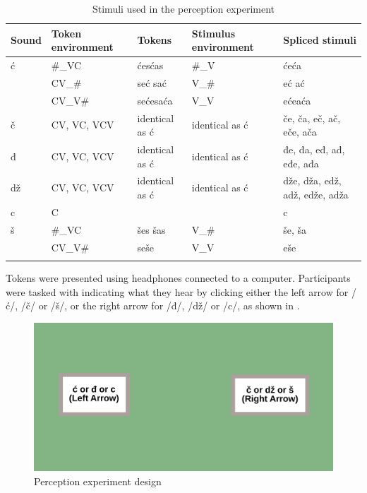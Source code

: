 \documentclass[output=paper,modfonts,nonflat,
]{langsci/langscibook}
\begin{document}
\begin{table}
\begin{tabularx}{\textwidth}{llXQQ}
\lsptoprule
 Sound &  Token environment &  Tokens &  Stimulus environment &  Spliced stimuli\\
\midrule
{ć} & \#\_VC & {ćes}\newline ćas & \#\_V & {će}\newline ća\\
& CV\_\# & {seć} \newline sać & V\_\# & {eć} \newline  ać\\

\tablevspace 
& CV\_V\# & {seće}\newline saća & V\_V & {eće}\newline aća\\

\tablevspace
č & CV, VC, VCV & identical as ć & identical as ć & če, ča, eč, ač, eče, ača\\
{đ} & CV, VC, VCV & identical as ć & identical as ć & đe, đa, eđ, ađ, eđe, ađa\\
dž & CV, VC, VCV & identical as ć & identical as ć & dže, dža, edž, adž, edže, adža\\
c & C &  &  & c\\
{š} & \#\_VC & {šes} \newline šas & V\_\# & še, ša\\
& CV\_V\# & seše & V\_V & eše\\
\lspbottomrule
\end{tabularx}
\caption{\label{tab:mihajlovic:3} Stimuli used in the perception experiment}
\end{table}


Tokens were presented using headphones connected to a computer. Participants were tasked with indicating what they hear by clicking either the left arrow for /ć/, /č/ or /š/, or the right arrow for /đ/, /dž/ or /c/, as shown in .

\begin{figure}
\includegraphics[height=.3\textheight]{figures/MCFigure4.pdf}
\caption{\label{fig:mihajlovic:4} Perception experiment design}
\end{figure}
\end{document}
